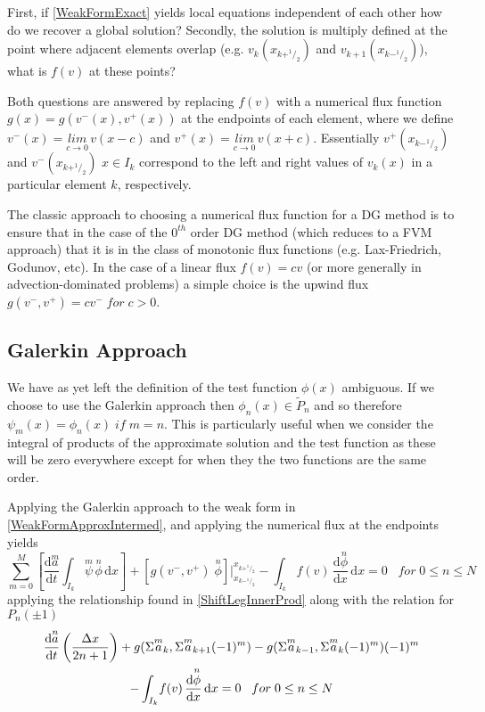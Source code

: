 \documentclass[letterpaper]{article}
\begin{document}
First, if \eqref{WeakFormExact} yields local equations independent of each other how do we recover a global solution? Secondly, the solution is multiply defined at the point where adjacent elements overlap (e.g. $v_k(x_{k+^1\!/_2})$ and $v_{k+1}(x_{k-^1\!/_2})$\;), what is $f(v)$ at these points?

Both questions are answered by replacing $f(v)$ with a numerical flux function $g(x) = g(v^-(x),v^+(x))$ at the endpoints of each element, where we define $v^-(x) = \underset{c \to 0}{lim} \,v(x-c)$ and $v^+(x) = \underset{c \to 0}{lim} \,v(x+c)$. Essentially $v^+(x_{k-^1\!/_2})$ and $v^-(x_{k+^1\!/_2})$ $x \in I_k$ correspond to the left and right values of $v_k(x)$ in a particular element $k$, respectively.

The classic approach to choosing a numerical flux function for a DG method is to ensure that in the case of the $0^{th}$ order DG method (which reduces to a FVM approach) that it is in the class of monotonic flux functions (e.g. Lax-Friedrich, Godunov, etc). In the case of a linear flux $f(v) = cv$ (or more generally in advection-dominated problems) a simple choice is the upwind flux $g(v^-,v^+) = cv^- \;for\; c>0$.

\subsection{Galerkin Approach}
We have as yet left the definition of the test function $\phi(x)$ ambiguous. If we choose to use the Galerkin approach then $\phi_n(x) \in \tilde{P}_n$ and so therefore $\psi_m(x) = \phi_n(x) \;if\; m=n$. This is particularly useful when we consider the integral of products of the approximate solution and the test function as these will be zero everywhere except for when they the two functions are the same order.

Applying the Galerkin approach to the weak form in \eqref{WeakFormApproxIntermed}, and applying the numerical flux at the endpoints yields
	\begin{equation}\label{WeakFormNumFluxIntermed}
	\sum_{m=0}^M \left[ \frac{\mathrm{d}\overset{m}{a}}{\mathrm{d} t} \int_{I_k}\! \overset{m}{\psi} \, \overset{n}{\phi} \,\mathrm{d}x \right] + 
	[g(v^-,v^+) \; \overset{n}{\phi}] \Big\rvert_{x_{k-^1\!/_2}}^{x_{k+^1\!/_2}} -  
	\int_{I_k}\! f(v) \,\frac{\mathrm{d} \overset{n}{\phi}}{\mathrm{d} x} \,\mathrm{d}x = 0
	\;\;\; for \; 0 \leq n \leq N
	\end{equation}
applying the relationship found in \eqref{ShiftLegInnerProd} along with the relation for $P_n(\pm 1)$
	\begin{gather}\label{WeakFormNumFlux}
	\frac{\mathrm{d}\overset{n}{a}}{\mathrm{d} t}\left(\frac{\Delta x}{2n+1}\right)
	+ g(\Sigma \overset{m}{a}_k,\Sigma \overset{m}{a}_{k+1}(-1)^m) - g(\Sigma \overset{m}{a}_{k-1},\Sigma \overset{m}{a}_{k}(-1)^m) (-1)^m\\
	- \int_{I_k}\! f(v) \,\frac{\mathrm{d} \overset{n}{\phi}}{\mathrm{d} x} \,\mathrm{d}x = 0
	\;\;\; for \; 0 \leq n \leq N \notag
	\end{gather}
\end{document}
